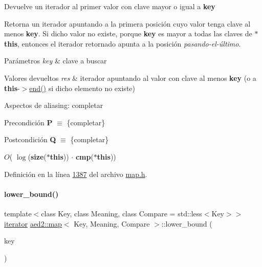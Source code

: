 Devuelve un iterador al primer valor con clave mayor o igual a {\bfseries key} 

Retorna un iterador apuntando a la primera posición cuyo valor tenga clave al menos {\bfseries key}. Si dicho valor no existe, porque {\bfseries key} es mayor a todas las claves de {\bfseries $\ast$this}, entonces el iterador retornado apunta a la posición {\itshape pasando-\/el-\/último}.


\begin{DoxyParams}{Parámetros}
{\em key} & clave a buscar \\
\hline
\end{DoxyParams}

\begin{DoxyRetVals}{Valores devueltos}
{\em res} & iterador apuntando al valor con clave al menos {\bfseries key} (o a {\bfseries this}-\/$>$\hyperlink{classaed2_1_1map_a76023e6a56cb625513e1b5ea028bf983_a76023e6a56cb625513e1b5ea028bf983}{end()} si dicho elemento no existe)\\
\hline
\end{DoxyRetVals}
\begin{DoxyParagraph}{Aspectos de aliasing\+:}
completar
\end{DoxyParagraph}
\begin{DoxyPrecond}{Precondición}
{\bfseries P} $\equiv$ \{completar\} 
\end{DoxyPrecond}
\begin{DoxyPostcond}{Postcondición}
{\bfseries Q} $\equiv$ \{completar\}
\end{DoxyPostcond}

\begin{DoxyDescription}
\item[Complejidad Temporal]$O$( $\log$({\bfseries size}({\bfseries $\ast$this})) $\cdot$ {\bfseries cmp}({\bfseries $\ast$this}))
\end{DoxyDescription}

Definición en la línea \hyperlink{map_8h_source_l01387}{1387} del archivo \hyperlink{map_8h_source}{map.\+h}.

\mbox{\label{classaed2_1_1map_a07b3dd65557c59ee085e5f211269c6b3_a07b3dd65557c59ee085e5f211269c6b3}} 
\paragraph{\texorpdfstring{lower\+\_\+bound()}{lower\_bound()}\hspace{0.1cm}{\footnotesize\ttfamily [2/2]}}
{\footnotesize\ttfamily template$<$class Key, class Meaning, class Compare = std\+::less$<$\+Key$>$$>$ \\
\hyperlink{classaed2_1_1map_1_1iterator}{iterator} \hyperlink{classaed2_1_1map}{aed2\+::map}$<$ Key, Meaning, Compare $>$\+::lower\+\_\+bound (\begin{DoxyParamCaption}\item[{const Key \&}]{key }\end{DoxyParamCaption})\hspace{0.3cm}{\ttfamily [inline]}}

